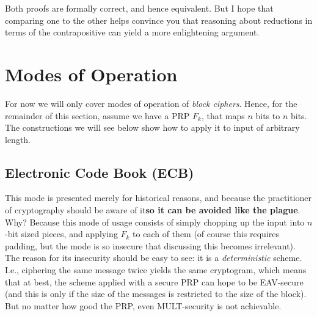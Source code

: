   \vspace{1em}

  \noindent Both proofs are formally correct, and hence equivalent. But I hope that comparing one to the other helps convince you that reasoning about reductions in terms of the contrapositive can  yield a more enlightening argument.

\section{Modes of Operation}
  \label{sec:modes_of_operations}
  For now we will only cover modes of operation of \emph{block ciphers}. Hence, for the remainder of this section, assume we have a PRP $F_k$, that maps $n$ bits to $n$ bits. The constructions we will see below show how to apply it to input of arbitrary length.

  \subsection{Electronic Code Book (ECB)}
  \label{sec:cbc_mode}
  This mode is presented merely for historical reasons, and because the practitioner of cryptography should be aware of it\emd \textbf{so it can be avoided like the plague}. Why? Because this mode of usage consists of simply chopping up the input into $n$-bit sized pieces, and applying $F_k$ to each of them (of course this requires padding, but the mode is so insecure that discussing this becomes irrelevant). The reason for its insecurity should be easy to see: it is a \emph{deterministic} scheme. I.e., ciphering the same message twice yields the same cryptogram, which means that at best, the scheme applied with a secure PRP can hope to be EAV-secure (and this is only if the size of the messages is restricted to the size of the block). But no matter how good the PRP, even MULT-security is not achievable.

